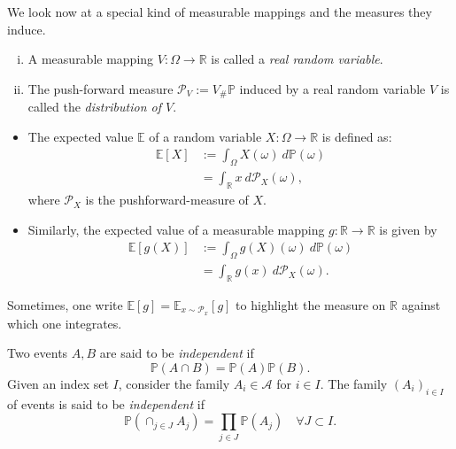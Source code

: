 We look now at a special kind of measurable mappings and the measures they induce.
\begin{definition}
	\label{def:RV}
	\begin{enumerate}[(i)] Let $(\Omega,\mathcal{A}, \mathbb{P})$ be a probability measure space.
		\item A measurable mapping $V: \Omega \to \mathbb{R}$ is called a \emph{real random variable}.
		\item The push-forward measure $\mathcal{P}_V := V_\# \mathbb{P}$ induced by a real random variable $V$ 
		is called the \emph{distribution of $V$}.		
	\end{enumerate}
\end{definition}

\begin{definition}
	\begin{itemize}
		\item The expected value $\mathbb{E}$ of a random variable $X: \Omega \to \mathbb{R}$
		is defined as:
		\begin{align*}
			\mathbb{E}[X] &:= \int_\Omega X(\omega) \ d\mathbb{P}(\omega) \\
			& = \int_\mathbb{R} x \ d\mathcal{P}_X(\omega),
		\end{align*}
		where $\mathcal{P}_X$ is the pushforward-measure of $X$.
		\item Similarly, the expected value of a measurable mapping $g:
		\mathbb{R}\to \mathbb{R}$ is given by 
		\begin{align*}
			\mathbb{E}[g(X)] &:= \int_\Omega g(X)(\omega) \ d\mathbb{P}(\omega) \\
			& = \int_\mathbb{R} g(x) \ d\mathcal{P}_X(\omega).
		\end{align*}
	\end{itemize}
	Sometimes, one write $\mathbb{E}[g] = \mathbb{E}_{x \sim \mathcal{P}_x}[g]$
	to highlight the measure on $\mathbb{R}$ against which one integrates.
\end{definition}


\begin{definition}
Two events $A,B$ are said to be \emph{independent} if $$\mathbb{P}(A \cap B) = \mathbb{P}(A)\mathbb{P}(B).$$ Given 
an index set $I$, consider the family $A_i \in \mathcal{A}$ for $i \in I$. The
family $(A_i)_{i\in I}$ of events is said to be \emph{independent}
if $$\mathbb{P}(\cap_{j \in J} A_j) = \prod_{j \in J} \mathbb{P}(A_j) \quad \forall J \subset I.$$	
\end{definition}

